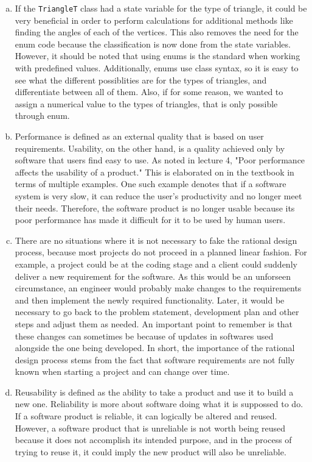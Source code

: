 \documentclass[12pt]{article}
\begin{document}
\begin{enumerate}[(a)]
\item If the \verb|TriangleT| class had a state variable for the type of triangle, it could be very beneficial in order to perform calculations for additional methods like finding the angles of each of the vertices. This also removes the need for the enum code because the classification is now done from the state variables. However, it should be noted that using enums is the standard when working with predefined values. Additionally, enums use class syntax, so it is easy to see what the different possiblities are for the types of triangles, and differentiate between all of them. Also, if for some reason, we wanted to assign a numerical value to the types of triangles, that is only possible through enum.  
\item Performance is defined as an external quality that is based on user requirements. Usability, on the other hand, is a quality achieved only by software that users find easy to use. As noted in lecture 4, "Poor performance affects the usability of a product." This is elaborated on in the textbook in terms of multiple examples. One such example denotes that if a software system is very slow, it can reduce the user's productivity and no longer meet their needs. Therefore, the software product is no longer usable because its poor performance has made it difficult for it to be used by human users.   
\item There are no situations where it is not necessary to fake the rational design process, because most projects do not proceed in a planned linear fashion. For example, a project could be at the coding stage and a client could suddenly deliver a new requirement for the software. As this would be an unforseen circumstance, an engineer would probably make changes to the requirements and then implement the newly required functionality. Later, it would be necessary to go back to the problem statement, development plan and other steps and adjust them as needed. An important point to remember is that these changes can sometimes be because of updates in softwares used alongside the one being developed. In short, the importance of the rational design process stems from the fact that software requirements are not fully known when starting a project and can change over time. 
\item Reusability is defined as the ability to take a product and use it to build a new one. Reliability is more about software doing what it is suppossed to do. If a software product is reliable, it can logically be altered and reused. However, a software product that is unreliable is not worth being reused because it does not accomplish its intended purpose, and in the process of trying to reuse it, it could imply the new product will also be unreliable.

\end{enumerate}
\end{document}
